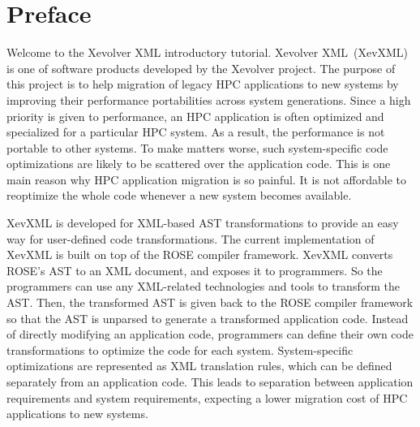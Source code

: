 
\chapter*{Preface}



Welcome to the Xevolver XML introductory tutorial.  Xevolver
XML~(XevXML) is one of software products developed by the Xevolver
project.  The purpose of this project is to help migration of legacy HPC
applications to new systems by improving their performance portabilities
across system generations.  Since a high priority is given to
performance, an HPC application is often optimized and specialized for a
particular HPC system. As a result, the performance is not portable to
other systems.  To make matters worse, such system-specific code
optimizations are likely to be scattered over the application code. This
is one main reason why HPC application migration is so painful. It is
not affordable to reoptimize the whole code whenever a new system
becomes available.



XevXML is developed for XML-based AST transformations to provide an easy
way for user-defined code transformations.  The current implementation
of XevXML is built on top of the ROSE compiler framework. XevXML
converts ROSE's AST to an XML document, and exposes it to
programmers. So the programmers can use any XML-related technologies and
tools to transform the AST. Then, the transformed AST is given back to
the ROSE compiler framework so that the AST is unparsed to generate a
transformed application code.  Instead of directly modifying an
application code, programmers can define their own code transformations
to optimize the code for each system.  System-specific optimizations are
represented as XML translation rules, which can be defined separately
from an application code.  This leads to separation between application
requirements and system requirements, expecting a lower migration cost
of HPC applications to new systems.
